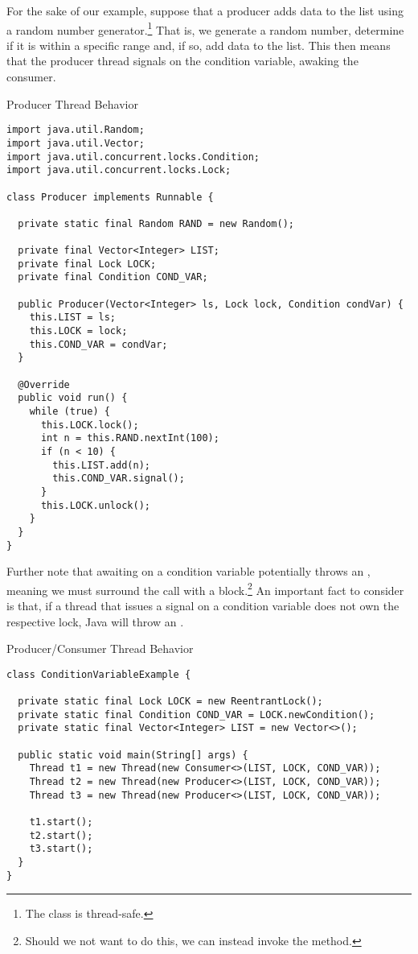 For the sake of our example, suppose that a producer adds data to the list using a random number generator.\footnote{The  class is thread-safe.} That is, we generate a random number, determine if it is within a specific range and, if so, add data to the list. This then means that the producer thread signals on the condition variable, awaking the consumer.

\begin{cl}{Producer Thread Behavior}
\begin{lstlisting}[language=MyJava]
import java.util.Random;
import java.util.Vector;
import java.util.concurrent.locks.Condition;
import java.util.concurrent.locks.Lock;

class Producer implements Runnable {

  private static final Random RAND = new Random();

  private final Vector<Integer> LIST;
  private final Lock LOCK;
  private final Condition COND_VAR;

  public Producer(Vector<Integer> ls, Lock lock, Condition condVar) {
    this.LIST = ls;
    this.LOCK = lock;
    this.COND_VAR = condVar;
  }

  @Override
  public void run() {
    while (true) {
      this.LOCK.lock();
      int n = this.RAND.nextInt(100);
      if (n < 10) {
        this.LIST.add(n);
        this.COND_VAR.signal();
      }
      this.LOCK.unlock();
    }
  }
}
\end{lstlisting}
\end{cl}

Further note that awaiting on a condition variable potentially throws an , meaning we must surround the call with a  block.\footnote{Should we not want to do this, we can instead invoke the  method.} An important fact to consider is that, if a thread that issues a signal on a condition variable does not own the respective lock, Java will throw an .

\begin{cl}{Producer/Consumer Thread Behavior}
\begin{lstlisting}[language=MyJava]
class ConditionVariableExample {

  private static final Lock LOCK = new ReentrantLock();
  private static final Condition COND_VAR = LOCK.newCondition();
  private static final Vector<Integer> LIST = new Vector<>();

  public static void main(String[] args) {
    Thread t1 = new Thread(new Consumer<>(LIST, LOCK, COND_VAR));
    Thread t2 = new Thread(new Producer<>(LIST, LOCK, COND_VAR));
    Thread t3 = new Thread(new Producer<>(LIST, LOCK, COND_VAR));

    t1.start();
    t2.start();
    t3.start();
  }
}
\end{lstlisting}
\end{cl}

